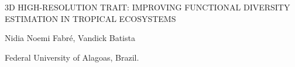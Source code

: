 \documentclass[a4paper]{article}
\begin{document}

\Large
\begin{center}
3D HIGH-RESOLUTION TRAIT: IMPROVING FUNCTIONAL DIVERSITY ESTIMATION IN TROPICAL ECOSYSTEMS\\ 

\hspace{10pt}

\large
Nidia Noemi Fabré, Vandick Batista \\

\hspace{10pt}

\small  
Federal University of Alagoas, Brazil.\\


\end{center}

\hspace{10pt}

\normalsize
\end{document}
